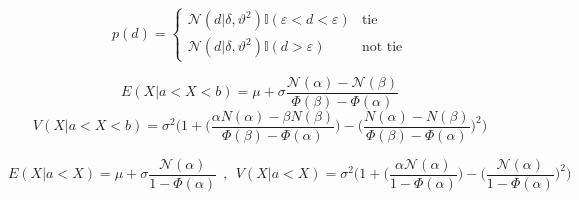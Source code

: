 \documentclass[article]{jss}
\newif\ifen
\newif\ifes
\newcommand{\en}[1]{\ifen#1\fi}
\newcommand{\es}[1]{\ifes#1\fi}
\newcommand{\N}{\mathcal{N}}
\begin{document}
%
\en{Remember that \texttt{teams}, \texttt{results}, and \texttt{p\_draw}, were defined in Code \ref{lst:game} and \ref{lst:draw}.}
\es{Recuerden que \texttt{teams}, \texttt{results}, y \texttt{p\_draw}, fueron definidas en los c\'odigos \ref{lst:game} y \ref{lst:draw}.}


\en{The need to approximate the posterior occurs because the probability distribution of the difference is a truncated Gasussian (Eq.~\ref{eq:p_d}).}
\es{La necesidad de aproximar el posterior ocurre debido a que la distribuci\'on de probabilidad de la diferencia es una Gasussian truncada (Eq.~\ref{eq:p_d}).}
%
\begin{equation}\label{eq:p_d}
p(d) =
\begin{cases}
\N(d|\delta,\vartheta^2) \mathbb{I}(\varepsilon < d < \varepsilon) & \text{tie} \\
\N(d|\delta,\vartheta^2) \mathbb{I}(d > \varepsilon) & \text{not tie}
\end{cases}
\end{equation}
%
\en{For Gaussian distributions, moment matching is known to minimize the Kullback-Leibler divergence~\citep{Herbrich2007}.}
\es{Se sabe que las distribuciones Gaussianas que minimizan la divergencia Kullback-Libler son las que tiene mismo momentos~\citep{Herbrich2007}.}
%
\en{The expectation and variance of a truncated Gaussian $\N(x|\mu,\sigma^2)$ in a $[a,b]$ interval are,}
\es{La esperanza y la varianza de una Gaussiana truncada $\N(x|\mu,\sigma^2)$ en un intervalo $[a,b]$ son,}
%
\begin{equation}\label{eq:mean_aprox_double}
 E(X| a < X < b) = \mu + \sigma \frac{\N(\alpha) - \N(\beta) }{\Phi(\beta) - \Phi(\alpha) }
\end{equation}
%
\begin{equation}\label{eq:variance_aprox_double}
 V(X| a < X < b) = \sigma^2 \Bigg( 1 + \bigg(\frac{\alpha N(\alpha) - \beta N(\beta) }{\Phi(\beta) - \Phi(\alpha) }\bigg) - \bigg(\frac{N(\alpha) - N(\beta) }{\Phi(\beta) - \Phi(\alpha) }\bigg)^2 \Bigg)
\end{equation}
%
\en{where $\beta = \frac{b-\mu}{\sigma}$ and $\alpha = \frac{a-\mu}{\sigma}$.}
\es{donde $\beta = \frac{b-\mu}{\sigma}$ y $\alpha = \frac{a-\mu}{\sigma}$.}
%
\en{With a single-sided truncation, these functions can be simplified as,}
\es{Con un \'unico truncamiento, estas funciones se pueden simplificar como,}
%
\begin{equation*}
 E(X| a < X )   =  \mu + \sigma \frac{\N(\alpha)}{1 - \Phi(\alpha) } \ \ , \ \ V(X| a < X )  = \sigma^2 \Bigg( 1 + \bigg(\frac{\alpha \N(\alpha)}{1 - \Phi(\alpha) }\bigg) - \bigg(\frac{\N(\alpha)}{1 - \Phi(\alpha) }\bigg)^2 \Bigg) 
\end{equation*}
\end{document}
